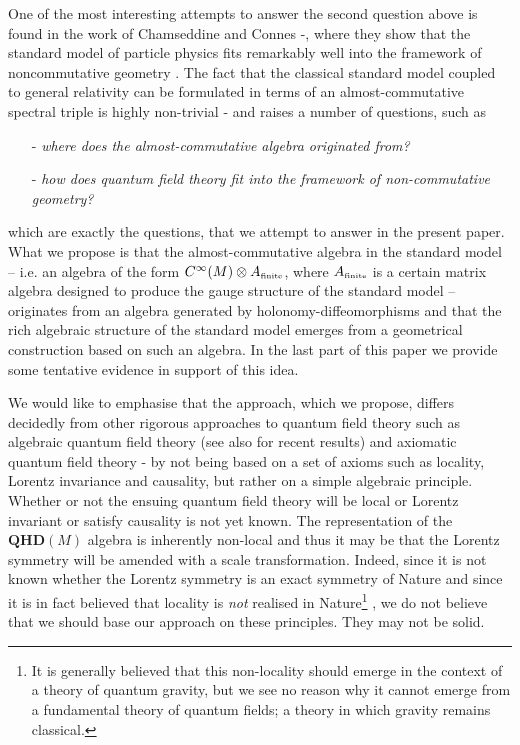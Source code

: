 \documentclass[12pt]{article}
\begin{document}
One of the most interesting attempts to answer the second question above is found in the work of Chamseddine and Connes \cite{Connes:1996gi}-\cite{Chamseddine:2012sw}, where they show that the standard model of particle physics fits remarkably well into the framework of noncommutative geometry \cite{ConnesBook,1414300}. The fact that the classical standard model coupled to general relativity can be formulated in terms of an almost-commutative spectral triple is highly non-trivial \cite{Krajewski:1996se}-\cite{Jureit:2009ye} and raises a number of questions, such as
\begin{itemize}
\item[-]
{\it where does the almost-commutative algebra originated from?}
\item[-]
{\it how does quantum field theory fit into the framework of non-commutative geometry?}
\end{itemize}
which are exactly the questions, that we attempt to answer in the present paper. What we propose is that the almost-commutative algebra in the standard model -- i.e. an algebra of the form $C^\infty(M)\otimes A_{\mbox{\tiny finite}}$, where $A_{\mbox{\tiny finite}}$ is a certain matrix algebra designed to produce the gauge structure of the standard model -- originates from an algebra generated by holonomy-diffeomorphisms and that the rich algebraic structure of the standard model emerges from a geometrical construction based on such an algebra. In the last part of this paper we provide some tentative evidence in support of this idea.





We would like to emphasise that the approach, which we propose, differs decidedly from other rigorous approaches to quantum field theory such as algebraic quantum field theory \cite{Bogo,Brunetti} (see also \cite{Buchholz} for recent results) and axiomatic quantum field theory \cite{Osterwalder:1973dx}-\cite{Haag:1992hx} by not being based on a set of axioms such as locality, Lorentz invariance and causality, but rather on a simple algebraic principle. Whether or not the ensuing quantum field theory will be local or Lorentz invariant or satisfy causality is not yet known. The representation of the ${\mathbf{QHD}}(M)$ algebra is inherently non-local \cite{Aastrup:2019yui,Aastrup:2017vrm} and thus it may be that the Lorentz symmetry will be amended with a scale transformation. Indeed, since it is not known whether the Lorentz symmetry is an exact symmetry of Nature \cite{Jacobson:2004rj} and since it is in fact believed that locality is {\it not} realised in Nature\footnote{It is generally believed that this non-locality should emerge in the context of a theory of quantum gravity, but we see no reason why it cannot emerge from a fundamental theory of quantum fields; a theory in which gravity remains classical.} \cite{Doplicher:1994tu}, we do not believe that we should base our approach on these principles. They may not be solid.
\end{document}
